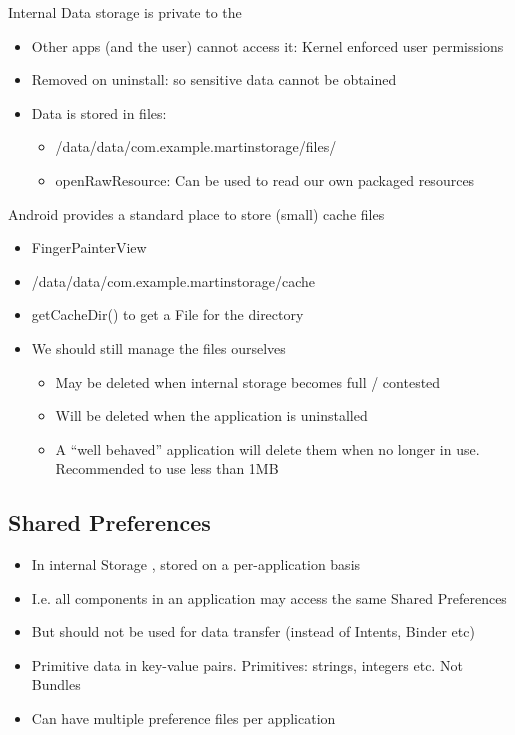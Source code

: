 \documentclass{article}
\begin{document}
\begin{flushleft}
Internal	Data	storage	is	private	to	the	
\begin{itemize}
  \item Other apps (and the user) cannot access it: Kernel enforced user permissions
  \item Removed	on	uninstall: so sensitive data cannot be obtained
  \item Data is stored in files:
  \begin{itemize}
    \item /data/data/com.example.martinstorage/files/
    \item openRawResource: Can be used to read our own packaged resources
  \end{itemize}
\end{itemize}
Android provides a standard place to store (small) cache files
\begin{itemize}
  \item FingerPainterView
  \item /data/data/com.example.martinstorage/cache
  \item getCacheDir() to get a File for the directory
  \item We should still manage the files ourselves
  \begin{itemize}
    \item May be deleted when internal storage becomes full / contested
    \item Will be deleted when the application is uninstalled 
    \item A “well behaved” application will delete them when no longer in use. Recommended to use less than 1MB
  \end{itemize}
\end{itemize}
\end{flushleft}

\subsection{Shared Preferences}

\begin{itemize}
  \item In internal Storage , stored on a per-application basis 
  \item I.e. all components in an application may access the same Shared Preferences 
  \item But should not be used for data transfer (instead of Intents, Binder etc) 
  \item Primitive data in key-value pairs. Primitives: strings, integers etc. Not Bundles 
  \item Can have multiple preference files per application
\end{itemize}
\end{document}
